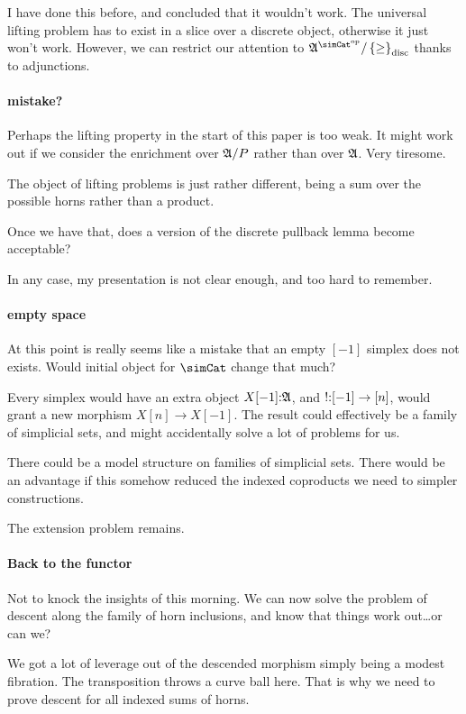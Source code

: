 \documentclass[csh.tex]{subfiles}
\begin{document}
I have done this before, and concluded that it wouldn't work. The universal lifting problem has to exist in a slice over a discrete object, otherwise it just won't work. However, we can restrict our attention to $\ambient\s/\set\geq\disc$ thanks to adjunctions.


\paragraph{mistake?}
Perhaps the lifting property in the start of this paper is too weak. It might work out if we consider the enrichment over $\mathfrak A/P$ rather than over $\mathfrak A$. Very tiresome.

The object of lifting problems is just rather different,
being a sum over the possible horns rather than a product.

Once we have that, does a version of the discrete pullback lemma become acceptable?

In any case, my presentation is not clear enough, and too hard to remember.

\paragraph{empty space}
At this point is really seems like a mistake that an empty $[-1]$ simplex does not exists. Would initial object for $\simCat$ change that much?

Every simplex would have an extra object $X[-1]\mathord :\mathfrak A$, and $!\mathord : [-1] \to [n]$, would grant a new morphism $X[n]\to X[-1]$. The result could effectively be a family of simplicial sets, and might accidentally solve a lot of problems for us.

There could be a model structure on families of simplicial sets.
There would be an advantage if this somehow reduced the indexed coproducts we need to simpler constructions.

The extension problem remains.


\paragraph{Back to the functor}
Not to knock the insights of this morning. We can now solve the problem of descent along the family of horn inclusions, and know that things work out\dots or can we?

We got a lot of leverage out of the descended morphism simply being a modest fibration. The transposition throws a curve ball here. That is why we need to prove descent for all indexed sums of horns.
\end{document}
